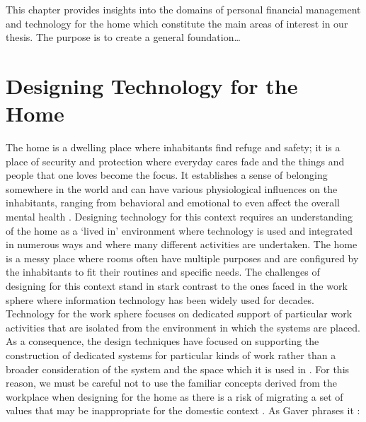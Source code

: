 This chapter provides insights into the domains of personal financial management and technology for the home which constitute the main areas of interest in our thesis. The purpose is to create a general foundation…

\section{Designing Technology for the Home}
The home is a dwelling place where inhabitants find refuge and safety; it is a place of security and protection where everyday cares fade and the things and people that one loves become the focus. It establishes a sense of belonging somewhere in the world and can have various physiological influences on the inhabitants, ranging from behavioral and emotional to even affect the overall mental health \cite{boutruche2008raising}. Designing technology for this context requires an understanding of the home as a ‘lived in’ environment where technology is used and integrated in numerous ways and where many different activities are undertaken. The home is a messy place where rooms often have multiple purposes and are configured by the inhabitants to fit their routines and specific needs. The challenges of designing for this context stand in stark contrast to the ones faced in the work sphere where information technology has been widely used for decades. Technology for the work sphere focuses on dedicated support of particular work activities that are isolated from the environment in which the systems are placed. As a consequence, the design techniques have focused on supporting the construction of dedicated systems for particular kinds of work rather than a broader consideration of the system and the space which it is used in \cite{hughes1998understanding}. For this reason, we must be careful not to use the familiar concepts derived from the workplace when designing for the home as there is a risk of migrating a set of values that may be inappropriate for the domestic context \cite{crabtree2003finding}. As Gaver phrases it \cite{gaver2001designing}:


